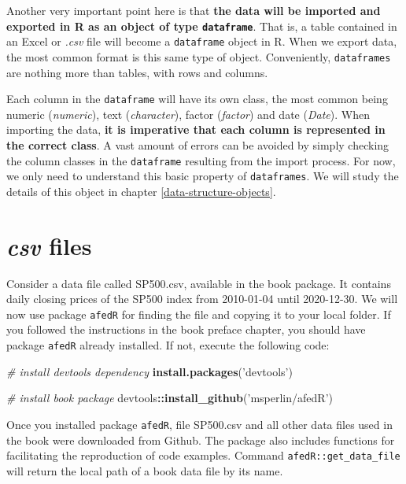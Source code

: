 \documentclass[
  12pt,
]{book}
\newenvironment{Shaded}{\begin{snugshade}}{\end{snugshade}}
\newcommand{\CommentTok}[1]{\textcolor[rgb]{0.37,0.37,0.37}{\textit{#1}}}
\newcommand{\KeywordTok}[1]{\textcolor[rgb]{0.27,0.27,0.27}{\textbf{#1}}}
\newcommand{\NormalTok}[1]{#1}
\newcommand{\OperatorTok}[1]{\textcolor[rgb]{0.43,0.43,0.43}{\textbf{#1}}}
\newcommand{\StringTok}[1]{\textcolor[rgb]{0.5,0.5,0.5}{#1}}
\begin{document}
Another very important point here is that \textbf{the data will be imported and exported in R as an object of type \texttt{dataframe}}. That is, a table contained in an Excel or \emph{.csv} file will become a \texttt{dataframe} object in R. When we export data, the most common format is this same type of object. Conveniently, \texttt{dataframes} are nothing more than tables, with rows and columns.

Each column in the \texttt{dataframe} will have its own class, the most common being numeric (\emph{numeric}), text (\emph{character}), factor (\emph{factor}) and date (\emph{Date}). When importing the data, \textbf{it is imperative that each column is represented in the correct class}. A vast amount of errors can be avoided by simply checking the column classes in the \texttt{dataframe} resulting from the import process. For now, we only need to understand this basic property of \texttt{dataframes}. We will study the details of this object in chapter \ref{data-structure-objects}.

\hypertarget{csv-files}{%
\section{\texorpdfstring{\emph{csv} files}{csv files}}\label{csv-files}}

Consider a data file called SP500.csv, available in the book package. It contains daily closing prices of the SP500 index from 2010-01-04 until 2020-12-30. We will now use package \texttt{afedR} for finding the file and copying it to your local folder. If you followed the instructions in the book preface chapter, you should have package \texttt{afedR} already installed. If not, execute the following code: 

\begin{Shaded}
\begin{Highlighting}[]
\CommentTok{# install devtools dependency}
\KeywordTok{install.packages}\NormalTok{(}\StringTok{'devtools'}\NormalTok{)}

\CommentTok{# install book package}
\NormalTok{devtools}\OperatorTok{::}\KeywordTok{install_github}\NormalTok{(}\StringTok{'msperlin/afedR'}\NormalTok{)}
\end{Highlighting}
\end{Shaded}

Once you installed package \texttt{afedR}, file SP500.csv and all other data files used in the book were downloaded from Github. The package also includes functions for facilitating the reproduction of code examples. Command \texttt{afedR::get\_data\_file} will return the local path of a book data file by its name.
\end{document}
